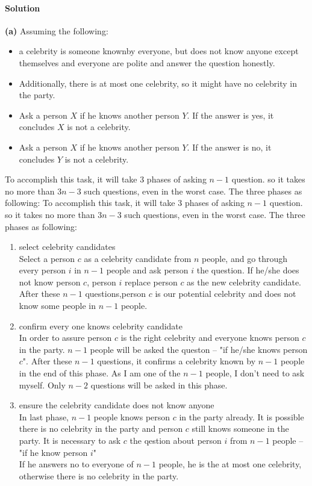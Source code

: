 \documentclass[a4paper]{scrartcl}
\begin{document}
\paragraph{Solution}
{\bfseries(a)}
Assuming the following:
\begin{itemize}
  \item a celebrity is someone knownby everyone, but does not know anyone except themselves and everyone are polite and answer the question honestly.
  \item Additionally, there is at most one celebrity, so it might have no celebrity in the party.
  \item Ask a person $X$ if he knows another person $Y$. If the answer is yes, it concludes $X$ is not a celebrity.
  \item Ask a person $X$ if he knows another person $Y$. If the answer is no, it concludes $Y$ is not a celebrity.
\end{itemize}
To accomplish this task, it will take 3 phases of asking $n-1$ question. so it takes no more than $3n-3$ such questions, even in the worst case.
The three phases as following:
To accomplish this task, it will take 3 phases of asking $n-1$ question. so it takes no more than $3n-3$ such questions, even in the worst case.
The three phases as following:
\begin{enumerate}
  \item select celebrity candidates\\
  Select a person $c$ as a celebrity candidate from $n$ people, and go through every person $i$ in $n-1$ people and ask person $i$ the question. If he/she does not know person $c$, person $i$ replace person $c$ as the new celebrity candidate. After these $n-1$ questions,person $c$ is our potential celebrity and does not know some people in $n-1$ people.
  \item confirm every one knows celebrity candidate\\
  In order to assure person $c$ is the right celebrity and everyone knows person $c$ in the party. $n-1$ people will be asked the queston -- "if he/she knows person $c$". After these $n-1$ questions, it confirms a celebrity known by $n-1$ people in the end of this phase.
  As I am one of the $n-1$ people, I don't need to ask myself. Only $n-2$ questions will be asked in this phase.
  \item ensure the celebrity candidate does not know anyone\\
  In last phase, $n-1$ people knows person $c$ in the party already. It is possible there is no celebrity in the party and person $c$ still knows someone in the party. It is necessary to ask $c$ the qestion about person $i$ from $n-1$ people -- "if he know person $i$"\\
  If he answers no to everyone of $n-1$ people, he is the at most one celebrity, otherwise there is no celebrity in the party.
\end{enumerate}
\end{document}
